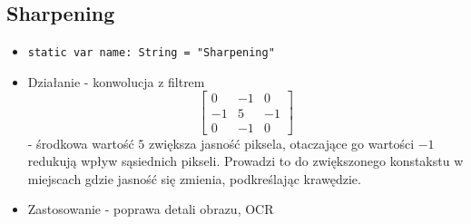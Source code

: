 \documentclass[a4paper]{article}
\begin{document}
\subsection{Sharpening}

\begin{itemize}
    \item \texttt{static var name: String = "Sharpening"}
    \item Działanie - konwolucja z filtrem
          $$
              \begin{bmatrix}
                  0  & -1 & 0  \\
                  -1 & 5  & -1 \\
                  0  & -1 & 0
              \end{bmatrix}
          $$
          - środkowa wartość $5$ zwiększa jasność piksela, otaczające go wartości $-1$ redukują wpływ sąsiednich pikseli. Prowadzi to do zwiększonego konstakstu w miejscach gdzie jasność się zmienia, podkreślając krawędzie.
    \item Zastosowanie - poprawa detali obrazu, OCR
\end{itemize}
\end{document}
